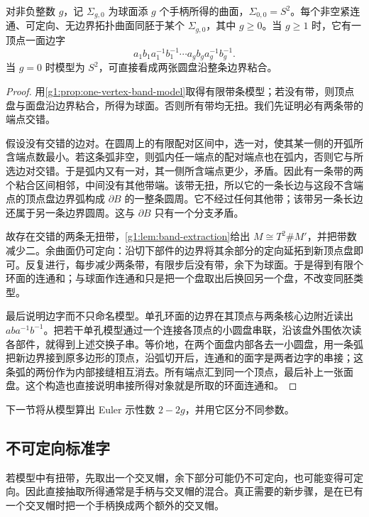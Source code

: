 \begin{proposition}\label{g1:prop:orientable-standard-word}
	对非负整数 \(g\)，记 \(\Sigma_{g,0}\) 为球面添 \(g\) 个手柄所得的曲面，\(\Sigma_{0,0}=S^2\)。每个非空紧连通、可定向、无边界拓扑曲面同胚于某个 \(\Sigma_{g,0}\)，其中 \(g\ge0\)。当 \(g\ge1\) 时，它有一顶点一面边字
	\[
		a_1b_1a_1^{-1}b_1^{-1}\cdots a_gb_ga_g^{-1}b_g^{-1}.
	\]
	当 \(g=0\) 时模型为 \(S^2\)，可直接看成两张圆盘沿整条边界粘合。
\end{proposition}
\begin{proof}
	用\cref{g1:prop:one-vertex-band-model}取得有限带条模型；若没有带，则顶点盘与面盘沿边界粘合，所得为球面。否则所有带均无扭。我们先证明必有两条带的端点交错。

	假设没有交错的边对。在圆周上的有限配对区间中，选一对，使其某一侧的开弧所含端点数最小。若这条弧非空，则弧内任一端点的配对端点也在弧内，否则它与所选边对交错。于是弧内又有一对，其一侧所含端点更少，矛盾。因此有一条带的两个粘合区间相邻，中间没有其他带端。该带无扭，所以它的一条长边与这段不含端点的顶点盘边界弧构成 \(\partial B\) 的一整条圆周。它不经过任何其他带；该带另一条长边还属于另一条边界圆周。这与 \(\partial B\) 只有一个分支矛盾。

	故存在交错的两条无扭带，\cref{g1:lem:band-extraction}给出 \(M\cong T^2\#M'\)，并把带数减少二。余曲面仍可定向：沿切下部件的边界将其余部分的定向延拓到新顶点盘即可。反复进行，每步减少两条带，有限步后没有带，余下为球面。于是得到有限个环面的连通和；与球面作连通和只是把一个盘取出后换回另一个盘，不改变同胚类型。

	最后说明边字而不只命名模型。单孔环面的边界在其顶点与两条核心边附近读出 \(aba^{-1}b^{-1}\)。把若干单孔模型通过一个连接各顶点的小圆盘串联，沿该盘外围依次读各部件，就得到上述交换子串。等价地，在两个面盘内部各去一小圆盘，用一条弧把新边界接到原多边形的顶点，沿弧切开后，连通和的面字是两者边字的串接；这条弧的两份作为内部接缝相互消去。所有端点汇到同一个顶点，最后补上一张面盘。这个构造也直接说明串接所得对象就是所取的环面连通和。
\end{proof}

下一节将从模型算出 Euler 示性数 \(2-2g\)，并用它区分不同参数。

\subsection{不可定向标准字}
\label{g1:subsec:0604:03}

若模型中有扭带，先取出一个交叉帽，余下部分可能仍不可定向，也可能变得可定向。因此直接抽取所得通常是手柄与交叉帽的混合。真正需要的新步骤，是在已有一个交叉帽时把一个手柄换成两个额外的交叉帽。

